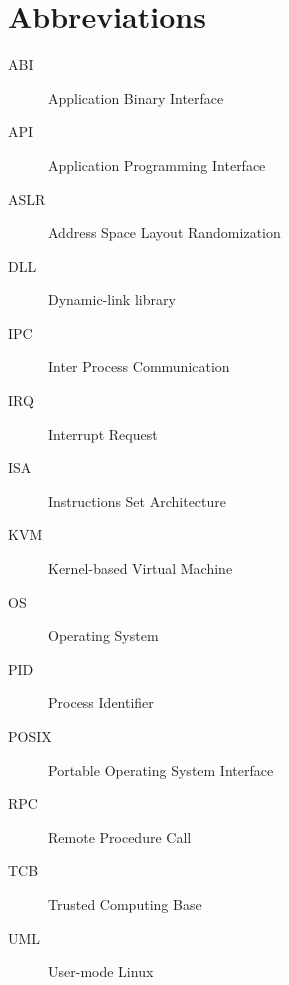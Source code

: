 \chapter*{Abbreviations}\label{abbr}
\begin{description}

\item[ABI] Application Binary Interface
\item[API] Application Programming Interface
\item[ASLR] Address Space Layout Randomization
\item[DLL] Dynamic-link library
\item[IPC] Inter Process Communication
\item[IRQ] Interrupt Request
\item[ISA] Instructions Set Architecture
\item[KVM] Kernel-based Virtual Machine
\item[OS] Operating System
\item[PID] Process Identifier
\item[POSIX] Portable Operating System Interface
\item[RPC] Remote Procedure Call
\item[TCB] Trusted Computing Base
\item[UML] User-mode Linux

\end{description}
